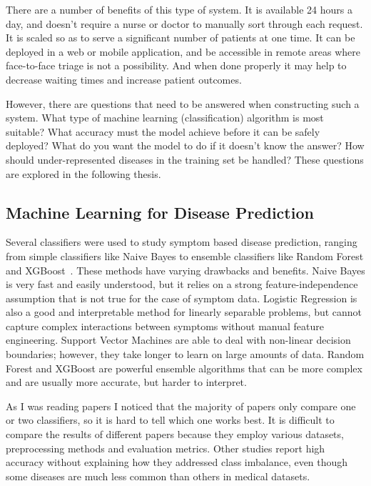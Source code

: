 There are a number of benefits of this type of system. It is available 24 hours a day, and doesn't require a nurse or doctor to manually sort through each request. It is scaled so as to serve a significant number of patients at one time. It can be deployed in a web or mobile application, and be accessible in remote areas where face-to-face triage is not a possibility. And when done properly it may help to decrease waiting times and increase patient outcomes.

However, there are questions that need to be answered when constructing such a system. What type of machine learning (classification) algorithm is most suitable? What accuracy must the model achieve before it can be safely deployed? What do you want the model to do if it doesn't know the answer? How should under-represented diseases in the training set be handled? These questions are explored in the following thesis.

\subsection{Machine Learning for Disease Prediction}

Several classifiers were used to study symptom based disease prediction, ranging from simple classifiers like Naive Bayes to ensemble classifiers like Random Forest and XGBoost~\citep{Uddin2019}. These methods have varying drawbacks and benefits. Naive Bayes is very fast and easily understood, but it relies on a strong feature-independence assumption that is not true for the case of symptom data. Logistic Regression is also a good and interpretable method for linearly separable problems, but cannot capture complex interactions between symptoms without manual feature engineering. Support Vector Machines are able to deal with non-linear decision boundaries; however, they take longer to learn on large amounts of data. Random Forest and XGBoost are powerful ensemble algorithms that can be more complex and are usually more accurate, but harder to interpret.

As I was reading papers I noticed that the majority of papers only compare one or two classifiers, so it is hard to tell which one works best. It is difficult to compare the results of different papers because they employ various datasets, preprocessing methods and evaluation metrics. Other studies report high accuracy without explaining how they addressed class imbalance, even though some diseases are much less common than others in medical datasets.

